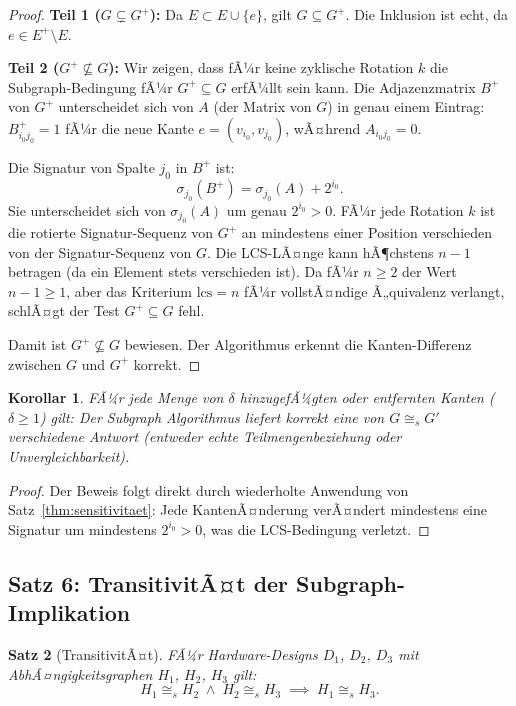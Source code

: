 ﻿\documentclass[12pt,a4paper]{report}
\newtheorem{theorem}{Satz}[section]
\newtheorem{korollar}[theorem]{Korollar}
\begin{document}
\begin{proof}
\textbf{Teil 1 ($G \subsetneq G^+$):} Da $E \subset E \cup \{e\}$, gilt $G \subseteq G^+$. Die Inklusion ist echt, da $e \in E^+ \setminus E$.

\textbf{Teil 2 ($G^+ \not\subseteq G$):} Wir zeigen, dass fÃ¼r keine zyklische Rotation $k$ die Subgraph-Bedingung fÃ¼r $G^+ \subseteq G$ erfÃ¼llt sein kann. Die Adjazenzmatrix $B^+$ von $G^+$ unterscheidet sich von $A$ (der Matrix von $G$) in genau einem Eintrag: $B^+_{i_0 j_0} = 1$ fÃ¼r die neue Kante $e = (v_{i_0}, v_{j_0})$, wÃ¤hrend $A_{i_0 j_0} = 0$.

Die Signatur von Spalte $j_0$ in $B^+$ ist:
\[
\sigma_{j_0}(B^+) = \sigma_{j_0}(A) + 2^{i_0}.
\]
Sie unterscheidet sich von $\sigma_{j_0}(A)$ um genau $2^{i_0} > 0$. FÃ¼r jede Rotation $k$ ist die rotierte Signatur-Sequenz von $G^+$ an mindestens einer Position verschieden von der Signatur-Sequenz von $G$. Die LCS-LÃ¤nge kann hÃ¶chstens $n-1$ betragen (da ein Element stets verschieden ist). Da fÃ¼r $n \geq 2$ der Wert $n-1 \geq 1$, aber das Kriterium $\mathrm{lcs} = n$ fÃ¼r vollstÃ¤ndige Ã„quivalenz verlangt, schlÃ¤gt der Test $G^+ \subseteq G$ fehl.

Damit ist $G^+ \not\subseteq G$ bewiesen. Der Algorithmus erkennt die Kanten-Differenz zwischen $G$ und $G^+$ korrekt.
\end{proof}

\begin{korollar}
\label{kor:sensitivitaet}
FÃ¼r jede Menge von $\delta$ hinzugefÃ¼gten oder entfernten Kanten ($\delta \geq 1$) gilt: Der Subgraph Algorithmus liefert korrekt eine von $G \cong_s G'$ verschiedene Antwort (entweder echte Teilmengenbeziehung oder Unvergleichbarkeit).
\end{korollar}

\begin{proof}
Der Beweis folgt direkt durch wiederholte Anwendung von Satz~\ref{thm:sensitivitaet}: Jede KantenÃ¤nderung verÃ¤ndert mindestens eine Signatur um mindestens $2^{i_0} > 0$, was die LCS-Bedingung verletzt.
\end{proof}

\subsection{Satz 6: TransitivitÃ¤t der Subgraph-Implikation}

\begin{theorem}[TransitivitÃ¤t]
\label{thm:transitivitaet}
FÃ¼r Hardware-Designs $D_1$, $D_2$, $D_3$ mit AbhÃ¤ngigkeitsgraphen $H_1$, $H_2$, $H_3$ gilt:
\[
H_1 \cong_s H_2 \;\land\; H_2 \cong_s H_3 \;\implies\; H_1 \cong_s H_3.
\]
\end{theorem}
\end{document}
